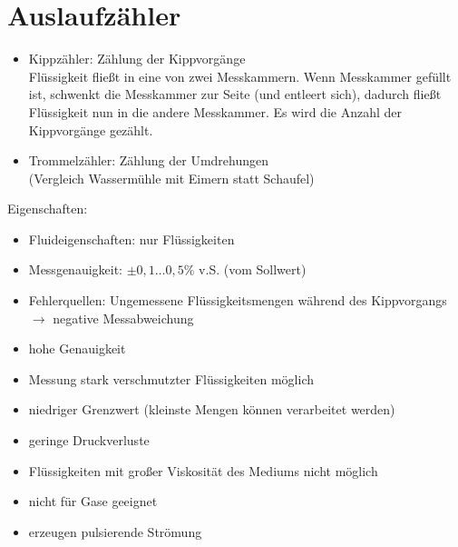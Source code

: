 \section{Auslaufzähler}
\begin{itemize}
\item Kippzähler: Zählung der Kippvorgänge\\
Flüssigkeit fließt in eine von zwei Messkammern. Wenn Messkammer gefüllt ist, schwenkt die Messkammer zur Seite (und entleert sich), dadurch fließt Flüssigkeit nun in die andere Messkammer. Es wird die Anzahl der Kippvorgänge gezählt.
\item Trommelzähler: Zählung der Umdrehungen\\
(Vergleich Wassermühle mit Eimern statt Schaufel)
\end{itemize}
Eigenschaften:
\begin{itemize}
\item Fluideigenschaften: nur Flüssigkeiten
\item Messgenauigkeit: $\pm 0,1 \ldots 0,5 \%$ v.S. (vom Sollwert)
\item Fehlerquellen: Ungemessene Flüssigkeitsmengen während des Kippvorgangs\\
$\to$ negative Messabweichung
\end{itemize}
\begin{itemize}[label=$+$]
\item hohe Genauigkeit
\item Messung stark verschmutzter Flüssigkeiten möglich
\item niedriger Grenzwert (kleinste Mengen können verarbeitet werden)
\item geringe Druckverluste
\end{itemize}
\begin{itemize}[label=$-$]
\item Flüssigkeiten mit großer Viskosität des Mediums nicht möglich
\item nicht für Gase geeignet
\item erzeugen pulsierende Strömung
\end{itemize}
